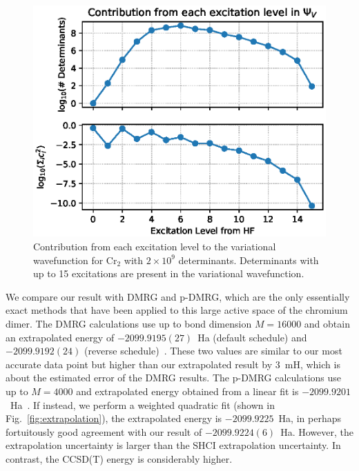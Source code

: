 \begin{figure}
  \begin{center}
  \includegraphics[width=0.9\linewidth]{figs/excitation.eps}
  \caption{Contribution from each excitation level to the variational wavefunction for Cr$_2$ with $2 \times 10^9$ determinants.
  Determinants with up to 15 excitations are present in the variational wavefunction.
}
  \label{fig:excit}
  \end{center}
\end{figure}

We compare our result with DMRG and p-DMRG, which are the only essentially exact methods that have been applied to this large active space of the chromium dimer.
The DMRG calculations use up to bond dimension $M=16000$ and obtain an extrapolated energy of $-2099.9195(27)$~Ha (default schedule) and $-2099.9192(24)$ (reverse schedule)~\cite{GuoLiCha-JCTC-18}.
These two values are similar to our most accurate data point but higher than our extrapolated result by 3~mH, which is about the estimated error of the DMRG results.
The p-DMRG calculations use up to $M=4000$ and extrapolated energy obtained from a linear fit is $-2099.9201$~Ha~\cite{GuoLiCha-JCTC-18}.
If instead, we perform a weighted quadratic fit (shown in Fig.~\ref{fig:extrapolation}), the extrapolated energy is $-2099.9225$~Ha,
in perhaps fortuitously good agreement with our result of $-2099.9224(6)$~Ha.  However, the extrapolation uncertainty is larger than the SHCI extrapolation uncertainty.
In contrast, the CCSD(T) energy is considerably higher.

